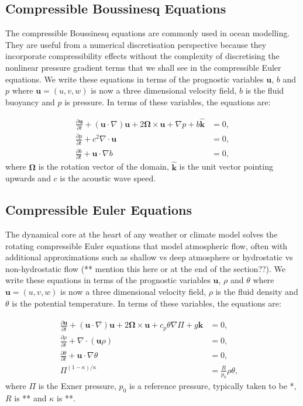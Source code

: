 \documentclass[11pt, a4paper]{article}
\def\MM#1{\boldsymbol{#1}}
\newcommand{\pp}[2]{\frac{\partial #1}{\partial #2}}
\begin{document}
\subsection{Compressible Boussinesq Equations}
The compressible Boussinesq equations are commonly used in ocean
modelling. They are useful from a numerical discretisation perspective
because they incorporate compressibility effects without the
complexity of discretising the nonlinear pressure gradient terms that
we shall see in the compressible Euler equations. We write these
equations in terms of the prognostic variables $\MM{u}$, $b$ and
$p$ where $\MM{u}=(u, v, w)$ is now a three dimensional velocity
field, $b$ is the fluid buoyancy and $p$ is pressure. In terms of
these variables, the equations are:

\begin{align}
  \pp{\MM{u}}{t} + 
  (\MM{u}\cdot\nabla)\MM{u} +
  2\MM{\Omega}\times \MM{u} + \nabla p + b\hat{\MM{k}} & = 0, \\
  \pp{p}{t} + c^2\nabla\cdot\MM{u} & = 0, \\
  \pp{b}{t} + \MM{u}\cdot\nabla b & = 0,
\end{align}
where $\MM{\Omega}$ is the rotation vector of the domain,
$\hat{\MM{k}}$ is the unit vector pointing upwards and $c$ is the
acoustic wave speed.

\subsection{Compressible Euler Equations}
The dynamical core at the heart of any weather or climate model solves
the rotating compressible Euler equations that model atmospheric flow,
often with additional approximations such as shallow vs deep
atmosphere or hydrostatic vs non-hydrostatic flow (** mention this
here or at the end of the section??). We write these equations in
terms of the prognostic variables $\MM{u}$, $\rho$ and $\theta$ where
$\MM{u}=(u, v, w)$ is now a three dimensional velocity field, $\rho$
is the fluid density and $\theta$ is the potential temperature. In
terms of these variables, the equations are:

\begin{align}
  \pp{\MM{u}}{t} + 
  (\MM{u}\cdot\nabla)\MM{u} +
  2\MM{\Omega}\times \MM{u} + c_p\theta\nabla \Pi + g\hat{\MM{k}} & = 0, \\
  \pp{\rho}{t} + \nabla\cdot(\MM{u}\rho) & = 0, \\
  \pp{\theta}{t} + \MM{u}\cdot\nabla\theta & = 0, \\
  \Pi^{(1-\kappa)/\kappa} & = \frac{R}{p_0}\rho\theta, & 
\end{align}
where $\Pi$ is the Exner pressure, $p_0$ is a reference pressure,
typically taken to be *, $R$ is ** and $\kappa$ is **.
\end{document}

